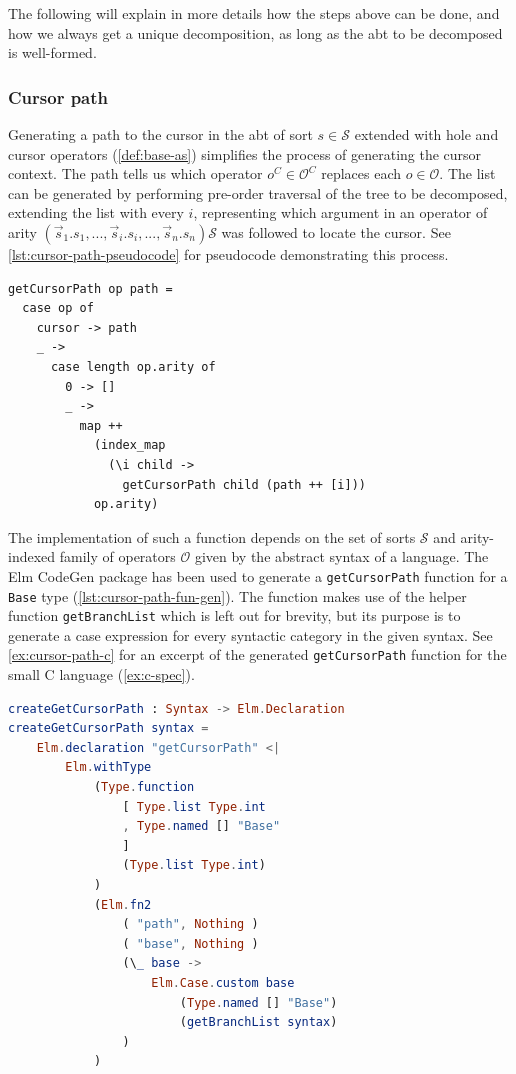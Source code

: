 The following will explain in more details how the steps above can be done,
and how we always get a unique decomposition, as long as the abt to be decomposed is well-formed.

\subsubsection{Cursor path}

Generating a path to the cursor in the abt of sort $s \in \mathcal{S}$ extended with
hole and cursor operators (\cref{def:base-as})
simplifies the process of generating the cursor context. The path tells us
which operator $o^C \in \mathcal{O}^C$ replaces each $o \in \mathcal{O}$.
The list can be generated by performing pre-order traversal of the tree to be decomposed,
extending the list with every $i$, representing which argument in an operator of
arity $(\vec{s}_1.s_1, ... , \vec{s}_i.s_i, ..., \vec{s}_n.s_n)\mathcal{S}$ was
followed to locate the cursor. See \cref{lst:cursor-path-pseudocode} for pseudocode
demonstrating this process.

\begin{lstlisting}[caption={Pseudocode for generating cursor path},label={lst:cursor-path-pseudocode},
  style=inline]
getCursorPath op path =
  case op of
    cursor -> path
    _ -> 
      case length op.arity of
        0 -> []
        _ -> 
          map ++ 
            (index_map 
              (\i child -> 
                getCursorPath child (path ++ [i])) 
            op.arity)

\end{lstlisting}

The implementation of such a function depends on the set of sorts $\mathcal{S}$
and arity-indexed family of operators $\mathcal{O}$ given by the abstract syntax
of a language. The Elm CodeGen package\cite{elm-codegen-package} has been used to
generate a \texttt{getCursorPath} function for a \texttt{Base} type (\cref{lst:cursor-path-fun-gen}).
The function makes use of the helper function
\texttt{getBranchList} which is left out for brevity, but its purpose is
to generate a case expression for every syntactic category in the given syntax.
See \cref{ex:cursor-path-c} for an excerpt of the generated \texttt{getCursorPath}
function for the small C language (\cref{ex:c-spec}).

\begin{lstlisting}[language=elm,style=inline,caption={getCursorPath function generator},label={lst:cursor-path-fun-gen}]
createGetCursorPath : Syntax -> Elm.Declaration
createGetCursorPath syntax =
    Elm.declaration "getCursorPath" <|
        Elm.withType
            (Type.function
                [ Type.list Type.int
                , Type.named [] "Base"
                ]
                (Type.list Type.int)
            )
            (Elm.fn2
                ( "path", Nothing )
                ( "base", Nothing )
                (\_ base ->
                    Elm.Case.custom base
                        (Type.named [] "Base")
                        (getBranchList syntax)
                )
            )    
\end{lstlisting}

